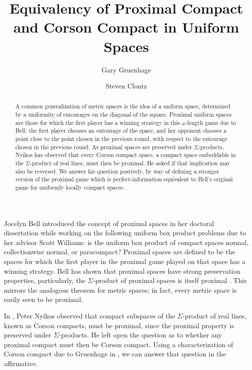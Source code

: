 \documentclass{amsart}
\theoremstyle{definition}
\theoremstyle{remark}
\newcommand{\<}{\langle}
\renewcommand{\>}{\rangle}
\begin{document}
\title{Equivalency of Proximal Compact and Corson Compact in Uniform Spaces}

\author{Gary Gruenhage}
\address{Department of Mathematics, Auburn University, 
Auburn, AL 36830}


\author{Steven Clontz}
\address{Department of Mathematics, Auburn University, 
Auburn, AL 36830}


\begin{abstract}
A common generalization of metric spaces is the idea of a uniform space, determined by a uniformity of entourages on the diagonal of the square. Proximal uniform spaces are those for which the first player has a winning strategy in this $\omega$-length game due to Bell: the first player chooses an entourage of the space, and her opponent chooses a point close to the point chosen in the previous round, with respect to the entourage chosen in the previous round. As proximal spaces are preserved under $\Sigma$-products, Nyikos has observed that every Corson compact space, a compact space embeddable in the $\Sigma$-product of real lines, must then be proximal. He asked if that implication may also be reversed. We answer his question postively, by way of defining a stronger version of the proximal game which is perfect-information equivalent to Bell's original game for uniformly locally compact spaces.
\end{abstract}


\maketitle



Jocelyn Bell introduced the concept of proximal spaces in her doctoral dissertation while working on the following uniform box product problems due to her advisor Scott Williams: is the uniform box product of compact spaces normal, collectionwise normal, or paracompact? Proximal spaces are defined to be the spaces for which the first player in the proximal game played on that space has a winning strategy. Bell has shown that proximal spaces have strong preservation properties, particularly, the $\Sigma$-product of proximal spaces is itself proximal \cite{b}. This mirrors the analogous theorem for metric spaces; in fact, every metric space is easily seen to be proximal.

In \cite{nproximal}, Peter Nyikos observed that compact subspaces of the $\Sigma$-product of real lines, known as Corson compacts, must be proximal, since the proximal property is preserved under $\Sigma$-products. He left open the question as to whether any proximal compact must then be Corson compact. Using a characterization of Corson compact due to Gruenhage in \cite{gcovering}, we can answer that question in the affirmative.
\end{document}
